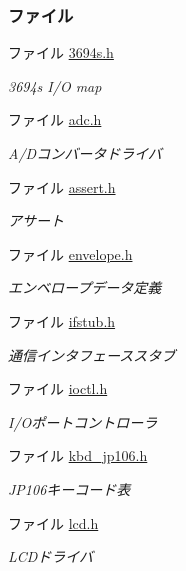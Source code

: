 \subsubsection*{ファイル}
\begin{DoxyCompactItemize}
\item 
ファイル \hyperlink{3694s_8h}{3694s.\+h}
\begin{DoxyCompactList}\small\item\em 3694s I/\+O map \end{DoxyCompactList}\item 
ファイル \hyperlink{adc_8h}{adc.\+h}
\begin{DoxyCompactList}\small\item\em A/\+Dコンバータドライバ \end{DoxyCompactList}\item 
ファイル \hyperlink{assert_8h}{assert.\+h}
\begin{DoxyCompactList}\small\item\em アサート \end{DoxyCompactList}\item 
ファイル \hyperlink{envelope_8h}{envelope.\+h}
\begin{DoxyCompactList}\small\item\em エンベロープデータ定義 \end{DoxyCompactList}\item 
ファイル \hyperlink{ifstub_8h}{ifstub.\+h}
\begin{DoxyCompactList}\small\item\em 通信インタフェーススタブ \end{DoxyCompactList}\item 
ファイル \hyperlink{ioctl_8h}{ioctl.\+h}
\begin{DoxyCompactList}\small\item\em I/\+Oポートコントローラ \end{DoxyCompactList}\item 
ファイル \hyperlink{kbd__jp106_8h}{kbd\+\_\+jp106.\+h}
\begin{DoxyCompactList}\small\item\em J\+P106キーコード表 \end{DoxyCompactList}\item 
ファイル \hyperlink{lcd_8h}{lcd.\+h}
\begin{DoxyCompactList}\small\item\em L\+C\+Dドライバ \end{DoxyCompactList}\item 

\end{DoxyCompactItemize}

